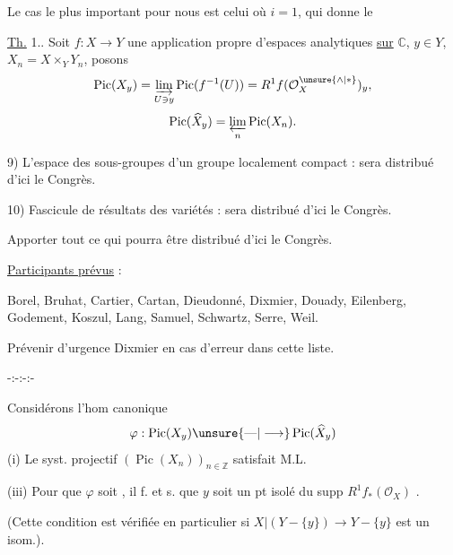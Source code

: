 Le cas le plus important pour nous est celui où $i=1$, qui donne le


\uline{Th.} 1.. Soit $f:X\longrightarrow Y$ une application propre d'espaces analytiques \uline{sur} $\mathbb C$, $y\in Y$,  $X_n=X\times_Y Y_n$,  posons
\[
\operatorname{Pic}(X_y)=\varinjlim_{U\ni y}\operatorname{Pic}(f^{-1}(U))
=R^1f(\mathcal O_X^{\unsure{\wedge|*}})_y,
\]
\[
\operatorname{Pic}(\widehat X_y)=\varprojlim_n\operatorname{Pic}(X_n).
\]

9) L'espace des sous-groupes d'un groupe localement compact : sera distribué d'ici le Congrès.

10) Fascicule de résultats des variétés : sera distribué d'ici le Congrès.

Apporter tout ce qui pourra être distribué d'ici le Congrès.

\uline{Participants prévus} :

Borel, Bruhat, Cartier, Cartan, Dieudonné, Dixmier, Douady, Eilenberg, Godement, Koszul, Lang, Samuel, Schwartz, Serre, Weil.

Prévenir d'urgence Dixmier en cas d'erreur dans cette liste.

\begin{center}-:-:-:-\end{center}

Considérons l'hom canonique
\[
\varphi:\operatorname{Pic}(X_y)\unsure{\text{---}|\longrightarrow}\operatorname{Pic}(\widehat X_y)
\]
(i) Le syst. projectif $(\operatorname{Pic}(X_n))_{n\in\mathbb Z}$ satisfait M.L.


(iii) Pour que $\varphi$ soit , il f. et s. que $y$ soit un pt isolé du supp $R^1f_*(\mathcal O_X)$ .

(Cette condition est vérifiée en particulier si $X|(Y-\{y\})\longrightarrow Y-\{y\}$ est un isom.).


